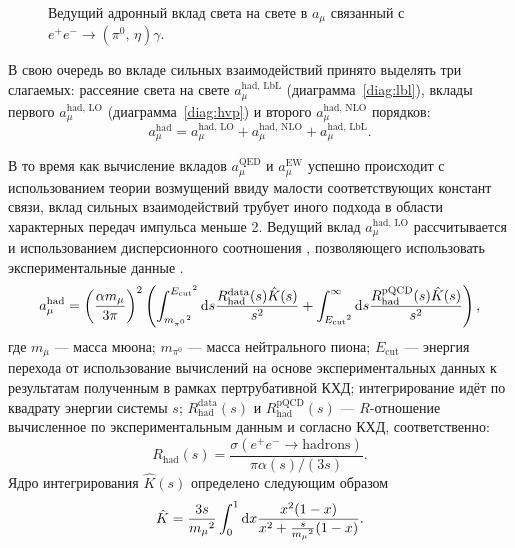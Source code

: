 \begin{figure}[htbp]
\begin{minipage}[t]{0.24\textwidth}
        \caption{Ведущий адронный вклад света на свете в $a_\mu$ связанный с $e^+ e^- \to ( \pi^0, \, \eta ) \gamma$.}\label{diag:lbl_Pg}
    \end{minipage}
\end{figure}
В свою очередь во вкладе сильных взаимодействий принято выделять три слагаемых:
рассеяние света на свете $a_\mu^{\text{had, LbL}}$ (диаграмма~\ref{diag:lbl}),
вклады первого $a_\mu^{\text{had, LO}}$ (диаграмма~\ref{diag:hvp}) и второго $a_\mu^{\text{had, NLO}}$ порядков:
\begin{equation}
    a_\mu^{\text{had}}
    =
    a_\mu^{\text{had, LO}}
    +
    a_\mu^{\text{had, NLO}}
    +
    a_\mu^{\text{had, LbL}}.
\end{equation}

В то время как вычисление вкладов $a_\mu^{\text{QED}}$ и $a_\mu^{\text{EW}}$ успешно происходит с использованием теории возмущений ввиду малости соответствующих констант связи,
вклад сильных взаимодействий трубует иного подхода в области характерных передач импульса меньше \SI{2}{\GeVr}.
Ведущий вклад $a_\mu^{\text{had, LO}}$ рассчитывается и использованием дисперсионного соотношения
\cite{Bouchiat1961, Durand:1962zzb, Kinoshita:1967txv, Gourdin:1969dm},
позволяющего использовать экспериментальные данные \cite{Jegerlehner:2017gek}.
\begin{equation}
   	a_\mu^{\text{had}} =
   	\left( \frac{\alpha m_\mu}{3 \pi} \right)^2
   	\left(
   		\int_{{m_{\pi^0}}^2}^{{E_{\text{cut}}}^2} \dif s
   		\frac{ R_{\text{had}}^{\text{data}}(s) \hat{K}(s) }{ s^2 }
   		+
   		\int_{{E_{\text{cut}}}^2}^{\infty} \dif s
   		\frac{ R_{\text{had}}^{\text{pQCD}}(s) \hat{K}(s) }{ s^2 }
   	\right) ,
\end{equation}
где
$ m_\mu $ --- масса мюона;
$ m_{\pi^0}$ --- масса нейтрального пиона;
$ E_{\text{cut}} $ --- энергия перехода от использование вычислений на основе экспериментальных данных к результатам полученным в рамках пертрубативной КХД;
интегрирование идёт по квадрату энергии системы $s$;
$ R_{\text{had}}^{\text{data}}(s) $ и $ R_{\text{had}}^{\text{pQCD}}(s) $ --- $R$-отношение вычисленное по экспериментальным данным и согласно КХД, соответственно:
\begin{equation}
	R_{\text{had}} (s) =
	\frac{
	   	\sigma(e^+ e^- \to \text{hadrons})
  	}{
  		\pi \alpha(s) / (3 s)
  	}.
\end{equation}
Ядро интегрирования $\hat{K}(s)$ определено следующим образом
\begin{equation}
	\hat{K}
  	=
   	\frac{3 s}{{m_\mu}^2}
  	\int_0^1 \dif x
  	\frac{ x^2 (1-x) }{ x^2 + \frac{s}{{m_\mu}^2} (1-x) } .
\end{equation}

